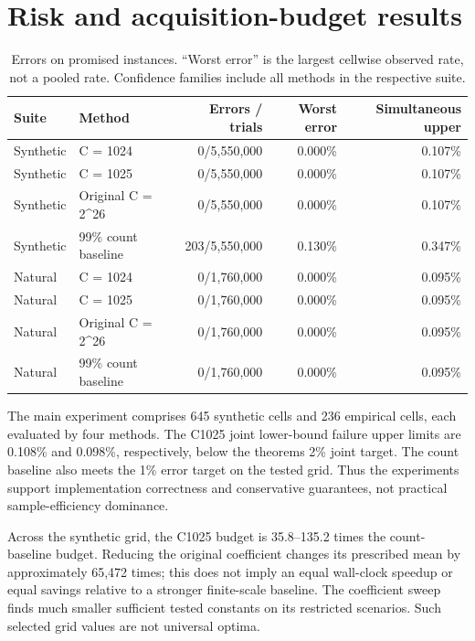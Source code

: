 \section{Risk and acquisition-budget results}

\begin{table}[tbp]\centering\small\begin{tabular}{llrrr}\toprule Suite & Method & Errors / trials & Worst error & Simultaneous upper\\\midrule

Synthetic & C = 1024 & 0/5,550,000 & 0.000\% & 0.107\%\\

Synthetic & C = 1025 & 0/5,550,000 & 0.000\% & 0.107\%\\

Synthetic & Original C = 2\textasciicircum{}26 & 0/5,550,000 & 0.000\% & 0.107\%\\

Synthetic & 99\% count baseline & 203/5,550,000 & 0.130\% & 0.347\%\\

Natural & C = 1024 & 0/1,760,000 & 0.000\% & 0.095\%\\

Natural & C = 1025 & 0/1,760,000 & 0.000\% & 0.095\%\\

Natural & Original C = 2\textasciicircum{}26 & 0/1,760,000 & 0.000\% & 0.095\%\\

Natural & 99\% count baseline & 0/1,760,000 & 0.000\% & 0.095\%\\

\bottomrule\end{tabular}\caption{Errors on promised instances. ``Worst error'' is the largest cellwise observed rate, not a pooled rate. Confidence families include all methods in the respective suite.}\end{table}

The main experiment comprises 645 synthetic cells and 236 empirical cells, each evaluated by four methods. The C1025 joint lower-bound failure upper limits are 0.108\% and 0.098\%, respectively, below the theorem\textquotesingle s 2\% joint target. The count baseline also meets the 1\% error target on the tested grid. Thus the experiments support implementation correctness and conservative guarantees, not practical sample-efficiency dominance.

Across the synthetic grid, the C1025 budget is 35.8--135.2 times the count-baseline budget. Reducing the original coefficient changes its prescribed mean by approximately 65,472 times; this does not imply an equal wall-clock speedup or equal savings relative to a stronger finite-scale baseline. The coefficient sweep finds much smaller sufficient tested constants on its restricted scenarios. Such selected grid values are not universal optima.

